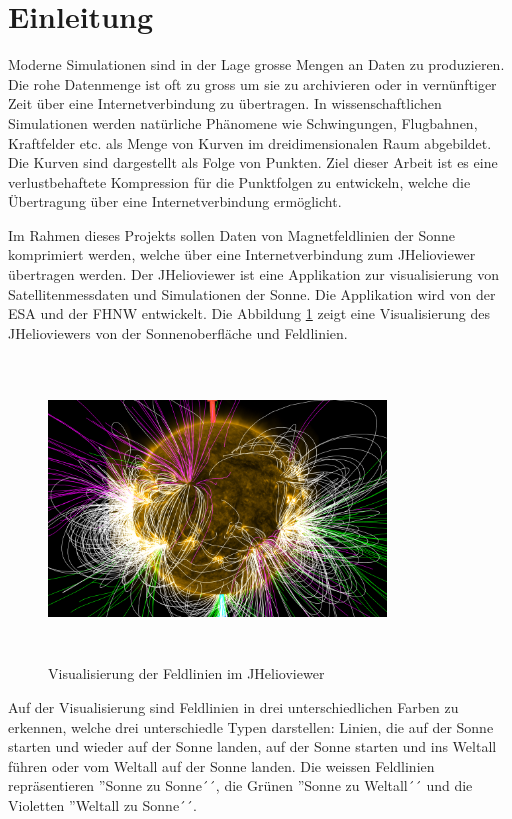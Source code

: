 \section{Einleitung}\label{einleitung}
Moderne Simulationen sind in der Lage grosse Mengen an Daten zu produzieren. Die rohe Datenmenge ist oft zu gross um sie zu archivieren oder in vernünftiger Zeit über eine Internetverbindung zu übertragen. In wissenschaftlichen Simulationen werden natürliche Phänomene wie Schwingungen, Flugbahnen, Kraftfelder etc. als Menge von Kurven im dreidimensionalen Raum abgebildet. Die Kurven sind dargestellt als Folge von Punkten. Ziel dieser Arbeit ist es eine verlustbehaftete Kompression für die Punktfolgen zu entwickeln, welche die Übertragung über eine Internetverbindung ermöglicht.

Im Rahmen dieses Projekts sollen Daten von Magnetfeldlinien der Sonne komprimiert werden, welche über eine Internetverbindung zum JHelioviewer übertragen werden. Der JHelioviewer ist eine Applikation zur visualisierung von Satellitenmessdaten und Simulationen der Sonne. Die Applikation wird von der ESA und der FHNW entwickelt. Die Abbildung \ref{einleitung::feldlinien} zeigt eine Visualisierung des JHelioviewers von der Sonnenoberfläche und Feldlinien.\\
\begin{figure}[!htbp]
\center
	\includegraphics[width=0.8\textwidth,height=8cm,keepaspectratio]{./pictures/einleitung/fieldLines.png}
	\caption{Visualisierung der Feldlinien im JHelioviewer}
	\label{einleitung::feldlinien}
\end{figure}
Auf der Visualisierung sind Feldlinien in drei unterschiedlichen Farben zu erkennen, welche drei unterschiedle Typen darstellen: Linien, die auf der Sonne starten und wieder auf der Sonne landen, auf der Sonne starten und ins Weltall führen oder vom Weltall auf der Sonne landen. Die weissen Feldlinien repräsentieren ''Sonne zu Sonne´´, die Grünen ''Sonne zu Weltall´´ und die Violetten ''Weltall zu Sonne´´.

